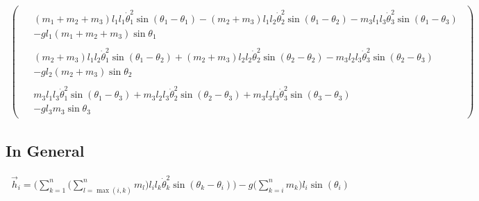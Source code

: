 \documentclass[11pt,a4paper]{article}
\begin{document}
\begin{align}
\begin{pmatrix}
\begin{aligned}
    &(m_1 + m_2 + m_3) l_1 l_1 \dot{\theta}_1^2 \sin(\theta_1 - \theta_1) -(m_2 + m_3) l_1 l_2 \dot{\theta}_2^2 \sin(\theta_1 - \theta_2) - m_3 l_1 l_3 \dot{\theta}_3^2 \sin(\theta_1 - \theta_3) \\
    &- g l_1 (m_1 + m_2 + m_3) \sin\theta_1
\end{aligned} \\[4ex]
\begin{aligned}
    &(m_2 + m_3) l_1 l_2 \dot{\theta}_1^2 \sin(\theta_1 - \theta_2) + (m_2 + m_3) l_2 l_2 \dot{\theta}_2^2 \sin(\theta_2 - \theta_2) - m_3 l_2 l_3 \dot{\theta}_3^2 \sin(\theta_2 - \theta_3) \\
    &- g l_2 (m_2 + m_3) \sin\theta_2
\end{aligned} \\[4ex]
\begin{aligned}
    &m_3 l_1 l_3 \dot{\theta}_1^2 \sin(\theta_1 - \theta_3) + m_3 l_2 l_3 \dot{\theta}_2^2 \sin(\theta_2 - \theta_3) + m_3 l_3 l_3 \dot{\theta}_3^2 \sin(\theta_3 - \theta_3) \\ &
    - g l_3 m_3 \sin\theta_3
\end{aligned}
\end{pmatrix}
\end{align}

\subsection{In General}

\begin{align}
    \vec{h}_i = \Bigg( \sum_{k = 1}^{n} \Big( \sum_{l = \max(i, k)}^{n} m_l \Big) l_i l_k \dot{\theta}_k^2 \sin(\theta_k - \theta_i) \Bigg) - g \Big( \sum_{k = i}^{n}{m_k} \Big) l_i \sin(\theta_i)
\end{align}
\end{document}
